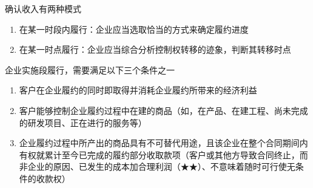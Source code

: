 \documentclass[UTF8,12pt]{ctexart}
\numberwithin{equation}{section} %
\numberwithin{figure}{section}
\numberwithin{table}{section}
\begin{document}
	确认收入有两种模式
	\begin{enumerate}
		\item 在某一时段内履行：企业应当选取恰当的方式来确定履约进度
		
		\item 在某一时点履行：企业应当综合分析控制权转移的迹象，判断其转移时点
	\end{enumerate}

	企业实施段履行，需要满足以下三个条件之一
	\begin{enumerate}
		\item 客户在企业履约的同时即取得并消耗企业履约所带来的经济利益
		
		\item 客户能够控制企业履约过程中在建的商品（如，在产品、在建工程、尚未完成的研发项目、正在进行的服务等）
		
		\item 企业履约过程中所产出的商品具有不可替代用途，且该企业在整个合同期间内有权就累计至今已完成的履约部分收取款项（客户或其他方导致合同终止，而非企业的原因、已发生的成本加合理利润（★★）、不意味着随时可行使无条件的收款权）
	\end{enumerate}
\end{document}
